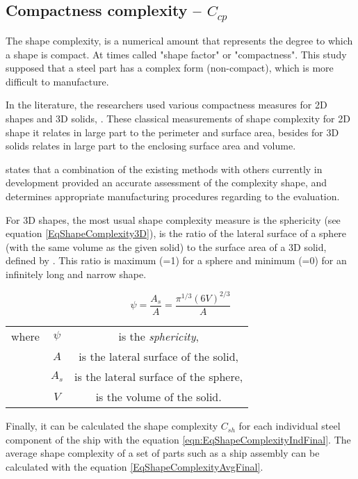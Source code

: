 \subsection{Compactness complexity -- $C_{cp}$}
The shape complexity, is a numerical amount that represents the degree to which a shape is compact. At times called "shape factor" or "compactness". This study supposed that a steel part has a complex form (non-compact), which is more difficult to manufacture.

In the literature, the researchers used various compactness measures for 2D shapes and 3D solids, \cite{valentan2008}. These classical measurements of shape complexity for 2D shape it relates in large part to the perimeter and surface area, besides for 3D solids relates in large part to the enclosing surface area and volume.

\cite{valentan2008} states that a combination of the existing methods with others currently in development provided an accurate assessment of the complexity shape, and determines appropriate manufacturing procedures regarding to the evaluation.

For 3D shapes, the most usual shape complexity measure is the sphericity (see equation \ref{EqShapeComplexity3D}), is the ratio of the lateral surface of a sphere (with the same volume as the given solid) to the surface area of a 3D solid, defined by \cite{wadell1935volume}. %
This ratio is maximum (=1) for a sphere and minimum (=0) for an infinitely long and narrow shape.

\begin{equation}
\psi = \frac{A_s}{A}= \frac{\pi^{1/3}(6V)^{2/3}}{A}
\label{eqn:EqShapeComplexity3D}
\end{equation}

\begin{tabular}{l c c}
where		& $\psi$ 	& is the \textit{sphericity},\\
				& $A$		& is the lateral surface of the solid,\\
				& $A_s$	& is the lateral surface of the sphere,\\
				& $V$		& is the volume of the solid.
\end{tabular}


Finally, it can be calculated the shape complexity $C_{sh}$ for each individual steel component of the ship with the equation \ref{eqn:EqShapeComplexityIndFinal}. The average shape complexity of a set of parts such as a ship assembly can be calculated  with the equation \ref{EqShapeComplexityAvgFinal}.


